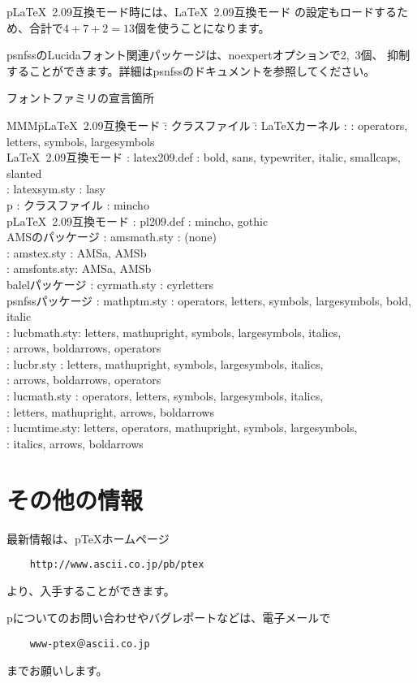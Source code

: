 \documentclass{plnews}
\begin{document}
p\LaTeX~2.09互換モード時には、\LaTeX~2.09互換モード
の設定もロードするため、合計で$4+7+2=13$個を使うことになります。

psnfssのLucidaフォント関連パッケージは、noexpertオプションで2,~3個、
抑制することができます。詳細はpsnfssのドキュメントを参照してください。

\begin{table*}[htb]
\caption{\label{famlist}フォントファミリの宣言箇所}
\begin{tabbing}
MMM\=p\LaTeX~2.09互換モード  \=: クラスファイル :\=\+\kill
\LaTeX カーネル
  \>:              \>: operators, letters, symbols, largesymbols\\
\LaTeX~2.09互換モード
  \>: latex209.def \>: bold, sans, typewriter, italic, smallcaps, slanted\\
  \>: latexsym.sty \>: lasy\\
p\LaTeXe 
  \>: クラスファイル \>: mincho\\
p\LaTeX~2.09互換モード
  \>: pl209.def   \>: mincho, gothic\\
AMSのパッケージ
  \>: amsmath.sty \>: (none)\\
  \>: amstex.sty  \>: AMSa, AMSb\\
  \>: amsfonts.sty\>: AMSa, AMSb\\
balelパッケージ
  \>: cyrmath.sty \>: cyrletters\\
psnfssパッケージ
  \>: mathptm.sty \>: operators, letters, symbols, largesymbols, bold, italic\\
  \>: lucbmath.sty\>: letters, mathupright, symbols, largesymbols, italics,\\
                \>\>: arrows, boldarrows, operators\\
  \>: lucbr.sty   \>: letters, mathupright, symbols, largesymbols, italics,\\
                \>\>: arrows, boldarrows, operators\\
  \>: lucmath.sty \>: operators, letters, symbols, largesymbols, italics,\\
                \>\>: letters, mathupright, arrows, boldarrows\\
  \>: lucmtime.sty\>: letters, operators, mathupright, symbols, largesymbols,\\
                \>\>: italics, arrows, boldarrows
\end{tabbing}
\end{table*}



\section{その他の情報}
最新情報は、p\TeX{}ホームページ
\begin{verbatim}
    http://www.ascii.co.jp/pb/ptex
\end{verbatim}
より、入手することができます。

p\LaTeXe{}についてのお問い合わせやバグレポートなどは、電子メールで
\begin{verbatim}
    www-ptex＠ascii.co.jp
\end{verbatim}
までお願いします。
\end{document}
